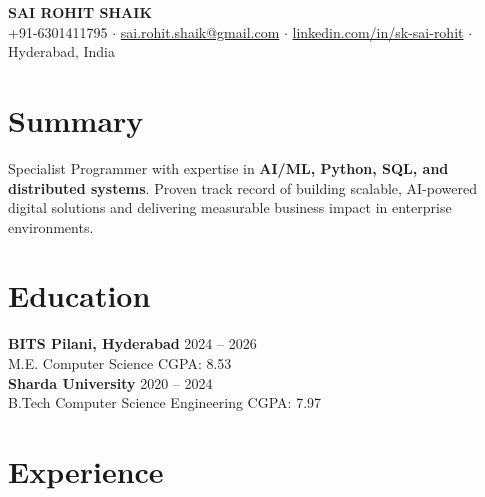 \documentclass[10.5pt]{article}
\begin{document}
\begin{center}
  {\Large \textbf{SAI ROHIT SHAIK}} \\
  \vspace{2pt}
  \small
  +91-6301411795 $\cdot$
  \href{mailto:sai.rohit.shaik@gmail.com}{sai.rohit.shaik@gmail.com} $\cdot$
  \href{https://linkedin.com/in/sk-sai-rohit}{linkedin.com/in/sk-sai-rohit} $\cdot$
  Hyderabad, India
\end{center}
\vspace{-8pt}

\section{Summary}
\vspace{1pt}
Specialist Programmer with expertise in \textbf{AI/ML, Python, SQL, and distributed systems}.
Proven track record of building scalable, AI-powered digital solutions and delivering measurable
business impact in enterprise environments.
\vspace{-6pt}

\section{Education}
\textbf{BITS Pilani, Hyderabad} \hfill 2024 -- 2026 \\
M.E. Computer Science \hfill CGPA: 8.53 \\[2pt]
\textbf{Sharda University} \hfill 2020 -- 2024 \\
B.Tech Computer Science Engineering \hfill CGPA: 7.97
\vspace{-6pt}

\section{Experience}
\end{document}
